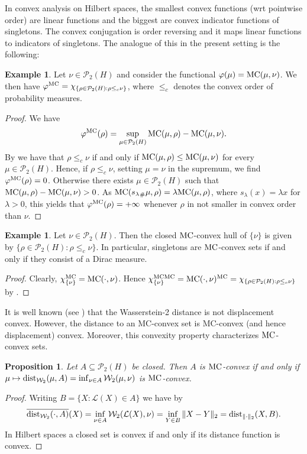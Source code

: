 \documentclass[a4paper]{amsart}
\numberwithin{theorem}{section}
\newtheorem{proposition}[theorem]{Proposition}
\theoremstyle{definition}
\newtheorem{example}[theorem]{Example}
\newcommand{\law}{\mathcal{L}}
\newcommand{\W}{\mathcal{W}}
\newcommand{\Pc}{\mathcal P}
\renewcommand{\subset}{\subseteq}
\renewcommand{\H}{H}
\renewcommand{\phi}{\varphi}
\newcommand{\mc}{\textup{MC}}
\begin{document}
In convex analysis on Hilbert spaces, the smallest convex functions (wrt pointwise order) are linear functions and the biggest are convex indicator functions of singletons. The convex conjugation is order reversing and it maps linear functions to indicators of singletons. The analogue of this in the present setting is the following:

\begin{example}\label{ex:MCMC}
Let $\nu \in \Pc_2(\H)$ and consider the functional $\phi(\mu) = \mc(\mu,\nu)$. We then have $\phi^\mc = \chi_{ \{ \rho \in \Pc_2(\H) : \rho \le_c \nu \}  }$, where $\le_c$ denotes the convex order of probability measures.
\end{example}
\begin{proof}
We have 
\[
\phi^\mc(\rho) = \sup_{ \mu \in \Pc_2(\H)} \mc(\mu,\rho) - \mc(\mu,\nu) .
\]
By \cite{Ca08, WiZh22} we have that $\rho \le_c \nu$ if and only if $\mc(\mu,\rho) \le \mc(\mu,\nu)$ for every $\mu \in \Pc_2(\H)$. Hence, if $\rho \le_c \nu$, setting $\mu=\nu$ in the supremum, we find $\phi^\mc(\rho)=0$. Otherwise there exists $\mu \in \Pc_2(\H)$ such that $\mc(\mu,\rho) - \mc(\mu,\nu) >0$.  As $\mc({s_\lambda}_\#\mu,\rho) = \lambda \mc(\mu,\rho)$, where $s_\lambda(x) = \lambda x$ for $\lambda >0$, this yields that $\phi^{\mc}(\rho) = +\infty$ whenever $\rho$ in not smaller in convex order than $\nu$.
\end{proof}

\begin{example}
Let $\nu \in \Pc_2(\H)$. Then the closed $\mc$-convex hull of $\{\nu\}$ is given by $\{ \rho \in \Pc_2(\H) : \rho \le_c \nu \}$. In particular, singletons are $\mc$-convex sets if and only if they consist of a Dirac measure.  
\end{example}
\begin{proof}
Clearly, $\chi_{\{\nu\}}^\mc = \mc(\cdot, \nu)$. Hence $  \chi_{\{\nu\}}^{\mc\mc} = \mc(\cdot,\nu)^\mc =  \chi_{ \{ \rho \in \Pc_2(\H) : \rho \le_c \nu \}  } $ by .
\end{proof}

It is well known (see \cite[Example 7.3.3]{AmGiSa08}) that the Wasserstein-2 distance is not displacement convex. However, the distance to an MC-convex set is MC-convex (and hence displacement) convex. Moreover, this convexity property characterizes $\mc$-convex sets. 

\begin{proposition}
Let $A \subset \Pc_2(\H)$ be closed. Then $A$ is $\mc$-convex if and only if $ \mu \mapsto \textup{dist}_{\W_2}(\mu,A) = \inf_{\nu \in A} \W_2(\mu,\nu)$ is $\mc$-convex.    
\end{proposition}
\begin{proof}
Writing $B = \{ X : \law(X) \in A\}$ we have by 
\[
\overline{\textup{dist}_{\W_2}(\cdot,A)}(X) = \inf_{\nu \in A} \W_2(\law(X), \nu) = \inf_{Y \in B} \| X- Y \|_2 = \textup{dist}_{\|\cdot\|_2}(X,B).
\]
In Hilbert spaces a closed set is convex if and only if its distance function is convex.
\end{proof}
\end{document}
